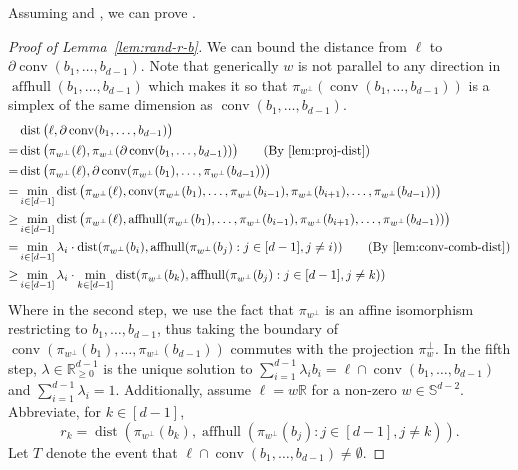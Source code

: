 \documentclass{article}\usepackage[a4paper,margin=20mm]{geometry}
\newcommand{\R}{\mathbb R}
\newcommand{\aff}{\operatorname{affhull}}
\newcommand{\conv}{\operatorname{conv}}
\newcommand{\dist}{\operatorname{dist}}
\begin{document}
Assuming  and , we can prove .

\begin{proof}[Proof of Lemma~\ref{lem:rand-r-b}]
    We can bound the distance from $\ell$ to $\partial \conv(b_1,\dots,b_{d-1})$.
    Note that generically $w$ is not parallel to any direction in $\aff(b_1,\dots,b_{d-1})$
    which makes it so that $\pi_{w^\perp}(\conv(b_1,\dots,b_{d-1}))$
    is a simplex of the same dimension as $\conv(b_1,\dots,b_{d-1})$.
    \begin{align*}
        & \dist \big(\ell, \partial \conv(b_1,\dots,b_{d-1}) \big) \\
        = & \dist \big(\pi_{w^\perp}(\ell), \pi_{w^\perp}(\partial \conv(b_1,\dots,b_{d-1})) \big) \tag{By \Cref{lem:proj-dist}} \\
        = & \dist \big(\pi_{w^\perp}(\ell), \partial \conv(\pi_{w^\perp}(b_1),\dots,\pi_{w^\perp}(b_{d-1})) \big) \\
        = & \min_{i \in [d-1]} \dist \big(\pi_{w^\perp}(\ell), \conv(\pi_{w^\perp}(b_1),\dots,\pi_{w^\perp}(b_{i-1}),\pi_{w^\perp}(b_{i+1}),\dots,\pi_{w^\perp}(b_{d-1})) \big) \\
        \geq & \min_{i \in [d-1]} \dist \big(\pi_{w^\perp}(\ell), \aff(\pi_{w^\perp}(b_1),\dots,\pi_{w^\perp}(b_{i-1}),\pi_{w^\perp}(b_{i+1}),\dots,\pi_{w^\perp}(b_{d-1})) \big) \\
        = & \min_{i \in [d-1]} \lambda_i \cdot \dist(\pi_{w^\perp}(b_i), \aff(\pi_{w^\perp}(b_j) : j \in [d-1], j \neq i)) \tag{By \Cref{lem:conv-comb-dist}}\\
        \geq & \min_{i \in [d-1]} \lambda_i \cdot  \min_{k \in [d-1]} \dist(\pi_{w^\perp}(b_k), \aff(\pi_{w^\perp}(b_j) : j \in [d-1], j \neq k))
    \end{align*}
    Where in the second step, we use the fact that $\pi_{w^{\perp}}$ is an affine isomorphism restricting to $b_{1}, \dots, b_{d-1}$, thus taking the boundary of $\conv(\pi_{w^\perp}(b_1),\dots,\pi_{w^\perp}(b_{d-1}))$ commutes with the projection $\pi_w^{\perp}$.
    In the fifth step,  $\lambda \in \R^{d-1}_{\geq 0}$ is the unique solution to $\sum_{i=1}^{d-1} \lambda_i b_i = \ell \cap \conv(b_1, \ldots, b_{d-1})$ and $\sum_{i=1}^{d-1} \lambda_i = 1$.
    Additionally, assume $\ell = w\R$ for a non-zero $w \in \mathbb{S}^{d-2}$.
    Abbreviate, for $k \in [d-1]$,
    $$r_k = \dist(\pi_{w^\perp}(b_k), \aff(\pi_{w^\perp}(b_j) : j \in [d-1], j \neq k)).$$
    Let $T$ denote the event that $\ell \cap \conv(b_1,\dots,b_{d-1}) \neq \emptyset$.

\end{proof}
\end{document}
